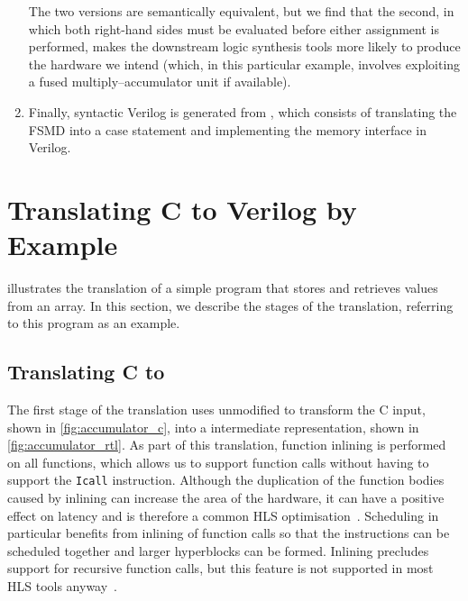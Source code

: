 \begin{enumerate}[label=\protect\blacknum{\arabic*}]
\begin{center}
\end{center}
%
The two versions are semantically equivalent, but we find that the second, in
which both right-hand sides must be evaluated before either assignment is
performed, makes the downstream logic synthesis tools more likely to produce the
hardware we intend (which, in this particular example, involves exploiting a
fused multiply--accumulator unit if available).
\item Finally, syntactic Verilog is generated from \htl{}, which consists of
  translating the \gls{FSMD} into a case statement and implementing the memory
  interface in Verilog.
\end{enumerate}

\section{Translating C to Verilog by Example}%
\label{sec:itv:translating-c-to-verilog}

 illustrates the translation of a simple program
that stores and retrieves values from an array.  In this section, we describe
the stages of the \vericert{} translation, referring to this program as an
example.

\subsection{Translating C to \rtl{}}

The first stage of the translation uses unmodified \compcert{} to transform the
C input, shown in \cref{fig:accumulator_c}, into a \rtl{} intermediate
representation, shown in \cref{fig:accumulator_rtl}.  As part of this
translation, function inlining is performed on all functions, which allows us to
support function calls without having to support the \texttt{Icall} \rtl{}
instruction.  Although the duplication of the function bodies caused by inlining
can increase the area of the hardware, it can have a positive effect on latency
and is therefore a common HLS optimisation~\cite{noronha17_rapid_fpga}.
Scheduling in particular benefits from inlining of function calls so that the
instructions can be scheduled together and larger hyperblocks can be formed.
Inlining precludes support for recursive function calls, but this feature is not
supported in most HLS tools anyway~\cite{thomas16_srcht}.

